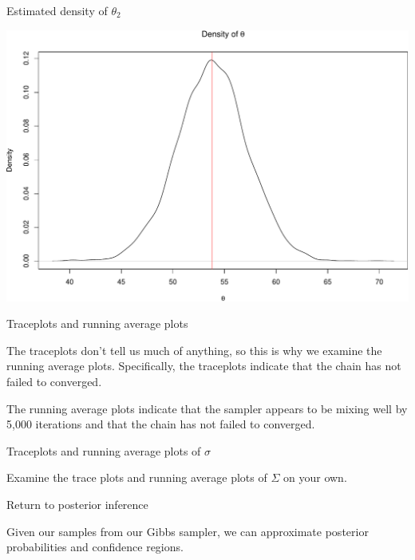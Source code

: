 \documentclass[
  ignorenonframetext,
]{beamer}
\begin{document}
\begin{frame}{Estimated density of \(\theta_2\)}
\protect\hypertarget{estimated-density-of-theta_2}{}

\includegraphics{08-multivariate-norm_files/figure-beamer/unnamed-chunk-17-1.pdf}

\end{frame}

\begin{frame}{Traceplots and running average plots}
\protect\hypertarget{traceplots-and-running-average-plots}{}

The traceplots don't tell us much of anything, so this is why we examine
the running average plots. Specifically, the traceplots indicate that
the chain has not failed to converged.

The running average plots indicate that the sampler appears to be mixing
well by 5,000 iterations and that the chain has not failed to converged.

\end{frame}

\begin{frame}{Traceplots and running average plots of \(\sigma\)}
\protect\hypertarget{traceplots-and-running-average-plots-of-sigma}{}

Examine the trace plots and running average plots of \(\Sigma\) on your
own.

\end{frame}

\begin{frame}{Return to posterior inference}
\protect\hypertarget{return-to-posterior-inference}{}

Given our samples from our Gibbs sampler, we can approximate posterior
probabilities and confidence regions.

\end{frame}
\end{document}

